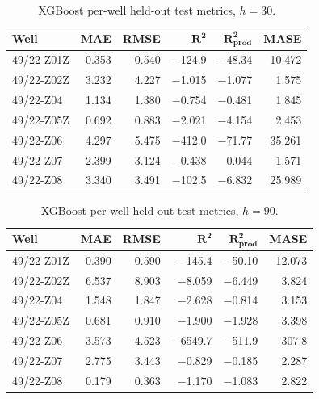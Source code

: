 \documentclass[10pt]{article}
\begin{document}
\begin{table}[ht]
\centering
\caption{XGBoost per-well held-out test metrics, $h{=}30$.}
\label{tab:xgboost_perwell_h30}
\small
\begin{tabular}{@{}l rrrrr @{}}
\toprule
\textbf{Well} & \textbf{MAE} & \textbf{RMSE} & $\boldsymbol{R^2}$ & $\boldsymbol{R^2_\text{prod}}$ & \textbf{MASE} \\
\midrule
49/22-Z01Z &  0.353 &  0.540 & $-$124.9  & $-$48.34 & 10.472 \\
49/22-Z02Z &  3.232 &  4.227 &    $-$1.015 &   $-$1.077 &  1.575 \\
49/22-Z04  &  1.134 &  1.380 &    $-$0.754 &   $-$0.481 &  1.845 \\
49/22-Z05Z &  0.692 &  0.883 &    $-$2.021 &   $-$4.154 &  2.453 \\
49/22-Z06  &  4.297 &  5.475 &  $-$412.0  & $-$71.77 & 35.261 \\
49/22-Z07  &  2.399 &  3.124 &    $-$0.438 &    0.044 &  1.571 \\
49/22-Z08  &  3.340 &  3.491 &  $-$102.5  &   $-$6.832 & 25.989 \\
\bottomrule
\end{tabular}
\end{table}


\begin{table}[ht]
\centering
\caption{XGBoost per-well held-out test metrics, $h{=}90$.}
\label{tab:xgboost_perwell_h90}
\small
\begin{tabular}{@{}l rrrrr @{}}
\toprule
\textbf{Well} & \textbf{MAE} & \textbf{RMSE} & $\boldsymbol{R^2}$ & $\boldsymbol{R^2_\text{prod}}$ & \textbf{MASE} \\
\midrule
49/22-Z01Z &  0.390 &   0.590 &   $-$145.4 &   $-$50.10 & 12.073 \\
49/22-Z02Z &  6.537 &   8.903 &     $-$8.059 &    $-$6.449 &  3.824 \\
49/22-Z04  &  1.548 &   1.847 &     $-$2.628 &    $-$0.814 &  3.153 \\
49/22-Z05Z &  0.681 &   0.910 &     $-$1.900 &    $-$1.928 &  3.398 \\
49/22-Z06  &  3.573 &   4.523 &  $-$6549.7  & $-$511.9   & 307.8 \\
49/22-Z07  &  2.775 &   3.443 &     $-$0.829 &    $-$0.185 &  2.287 \\
49/22-Z08  &  0.179 &   0.363 &     $-$1.170 &    $-$1.083 &  2.822 \\
\bottomrule
\end{tabular}
\end{table}
\end{document}
